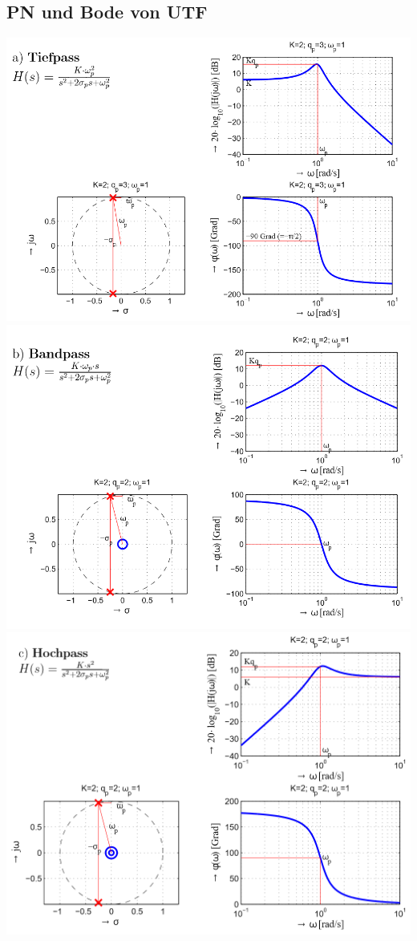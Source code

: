 \subsection{PN und Bode von UTF}\label{pn}
\begin{center}
	\includegraphics[width=0.8\columnwidth]{Images/tiefpass}\\
	\includegraphics[width=0.8\columnwidth]{Images/bandpass}\\
	\includegraphics[width=0.8\columnwidth]{Images/hochpass}\\

\end{center}
